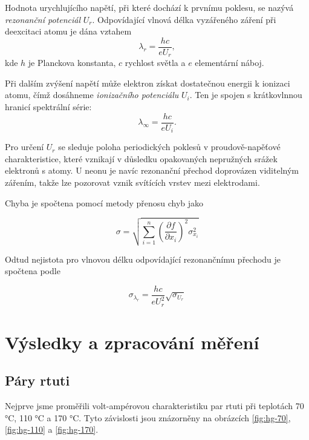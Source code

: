 Hodnota urychlujícího napětí, při které dochází k prvnímu poklesu, se nazývá \textit{rezonanční potenciál} $U_r$. Odpovídající vlnová délka vyzářeného záření při deexcitaci atomu je dána vztahem
\begin{equation}
    \lambda_r = \frac{hc}{eU_r},
\end{equation}
kde $h$ je Planckova konstanta, $c$ rychlost světla a $e$ elementární náboj.

Při dalším zvýšení napětí může elektron získat dostatečnou energii k ionizaci atomu, čímž dosáhneme \textit{ionizačního potenciálu} $U_i$. Ten je spojen s krátkovlnnou hranicí spektrální série:
\begin{equation}
    \lambda_\infty = \frac{hc}{eU_i}.
\end{equation}

Pro určení $U_r$ se sleduje poloha periodických poklesů v proudově-napěťové charakteristice, které vznikají v důsledku opakovaných nepružných srážek elektronů s atomy. U neonu je navíc rezonanční přechod doprovázen viditelným zářením, takže lze pozorovat vznik svítících vrstev mezi elektrodami.

Chyba je spočtena pomocí metody přenosu chyb \cite{bib:metoda-prenosu-chyb} jako

\begin{equation}
    \sigma = \sqrt{\sum^n_{i=1} \left( \frac{\partial f}{\partial x_i} \right)^2 \sigma^2_{x_i}}
\end{equation}

Odtud nejistota pro vlnovou délku odpovídající rezonančnímu přechodu je spočtena podle

\begin{equation}
    \sigma_{\lambda_r} = \frac{h c}{e U_r^2} \sqrt{\sigma_{U_r}}
\end{equation}

\section{Výsledky a zpracování měření}

\subsection{Páry rtuti}

Nejprve jsme proměřili volt-ampérovou charakteristiku par rtuti při teplotách 70 °C, 110 °C a 170 °C. Tyto závislosti jsou znázorněny na obrázcích \ref{fig:hg-70}, \ref{fig:hg-110} a \ref{fig:hg-170}.

